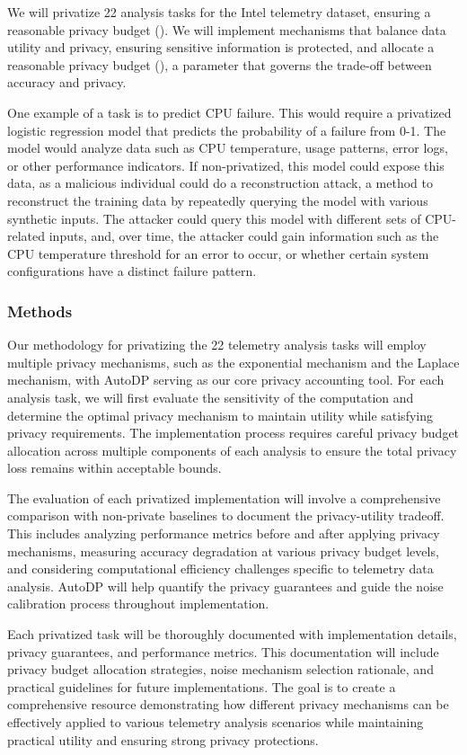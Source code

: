 \documentclass[12pt,letterpaper]{article}
\begin{document}
We will privatize 22 analysis tasks for the Intel telemetry dataset, ensuring a reasonable privacy budget (). We will implement mechanisms that balance data utility and privacy, ensuring sensitive information is protected, and allocate a reasonable privacy budget (), a parameter that governs the trade-off between accuracy and privacy.

One example of a task is to predict CPU failure. This would require a privatized logistic regression model that predicts the probability of a failure from 0-1. The model would analyze data such as CPU temperature, usage patterns, error logs, or other performance indicators. If non-privatized, this model could expose this data, as a malicious individual could do a reconstruction attack, a method to reconstruct the training data by repeatedly querying the model with various synthetic inputs. The attacker could query this model with different sets of CPU-related inputs, and, over time, the attacker could gain information such as the CPU temperature threshold for an error to occur, or whether certain system configurations have a distinct failure pattern.

\subsubsection{Methods}

Our methodology for privatizing the 22 telemetry analysis tasks will employ multiple privacy mechanisms, such as the exponential mechanism and the Laplace mechanism, with AutoDP serving as our core privacy accounting tool. For each analysis task, we will first evaluate the sensitivity of the computation and determine the optimal privacy mechanism to maintain utility while satisfying privacy requirements. The implementation process requires careful privacy budget allocation across multiple components of each analysis to ensure the total privacy loss remains within acceptable bounds.

The evaluation of each privatized implementation will involve a comprehensive comparison with non-private baselines to document the privacy-utility tradeoff. This includes analyzing performance metrics before and after applying privacy mechanisms, measuring accuracy degradation at various privacy budget levels, and considering computational efficiency challenges specific to telemetry data analysis. AutoDP will help quantify the privacy guarantees and guide the noise calibration process throughout implementation. 

Each privatized task will be thoroughly documented with implementation details, privacy guarantees, and performance metrics. This documentation will include privacy budget allocation strategies, noise mechanism selection rationale, and practical guidelines for future implementations. The goal is to create a comprehensive resource demonstrating how different privacy mechanisms can be effectively applied to various telemetry analysis scenarios while maintaining practical utility and ensuring strong privacy protections.
\end{document}
